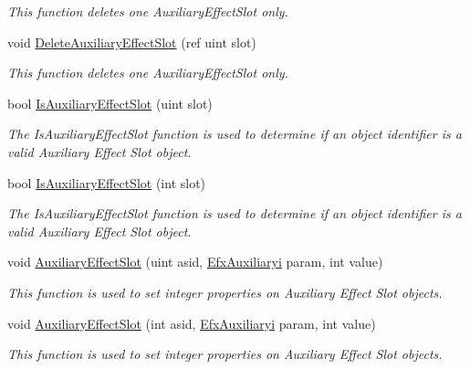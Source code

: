 \begin{DoxyCompactItemize}
\begin{DoxyCompactList}\small\item\em This function deletes one Auxiliary\-Effect\-Slot only.\end{DoxyCompactList}\item 
void \hyperlink{class_open_t_k_1_1_audio_1_1_open_a_l_1_1_effects_extension_a5abbcc03f381d5af6d8c0efc0eaec7d7}{Delete\-Auxiliary\-Effect\-Slot} (ref uint slot)
\begin{DoxyCompactList}\small\item\em This function deletes one Auxiliary\-Effect\-Slot only.\end{DoxyCompactList}\item 
bool \hyperlink{class_open_t_k_1_1_audio_1_1_open_a_l_1_1_effects_extension_a8682814f4f44ada674cb33a708a7020b}{Is\-Auxiliary\-Effect\-Slot} (uint slot)
\begin{DoxyCompactList}\small\item\em The Is\-Auxiliary\-Effect\-Slot function is used to determine if an object identifier is a valid Auxiliary Effect Slot object.\end{DoxyCompactList}\item 
bool \hyperlink{class_open_t_k_1_1_audio_1_1_open_a_l_1_1_effects_extension_ab15f348b6c2d0b171608a43849dddc24}{Is\-Auxiliary\-Effect\-Slot} (int slot)
\begin{DoxyCompactList}\small\item\em The Is\-Auxiliary\-Effect\-Slot function is used to determine if an object identifier is a valid Auxiliary Effect Slot object.\end{DoxyCompactList}\item 
void \hyperlink{class_open_t_k_1_1_audio_1_1_open_a_l_1_1_effects_extension_a3776963058c5c8e9dbaf29a7ded228ac}{Auxiliary\-Effect\-Slot} (uint asid, \hyperlink{namespace_open_t_k_1_1_audio_1_1_open_a_l_a94243a598006983d92449b374a5b60cc}{Efx\-Auxiliaryi} param, int value)
\begin{DoxyCompactList}\small\item\em This function is used to set integer properties on Auxiliary Effect Slot objects.\end{DoxyCompactList}\item 
void \hyperlink{class_open_t_k_1_1_audio_1_1_open_a_l_1_1_effects_extension_a02f757a149bd9e8ee56087ad884d2b12}{Auxiliary\-Effect\-Slot} (int asid, \hyperlink{namespace_open_t_k_1_1_audio_1_1_open_a_l_a94243a598006983d92449b374a5b60cc}{Efx\-Auxiliaryi} param, int value)
\begin{DoxyCompactList}\small\item\em This function is used to set integer properties on Auxiliary Effect Slot objects.\end{DoxyCompactList}\item 

\end{DoxyCompactItemize}
